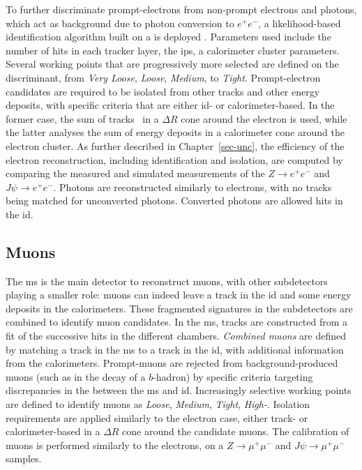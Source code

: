 To further discriminate prompt-electrons from non-prompt electrons and photons, which act as background due to photon conversion to $e^+e^-$, a likelihood-based identification algorithm built on a  is deployed \cite{Aaboud:2657964}. Parameters used include the number of hits in each tracker layer, the \glspl{ip}, a calorimeter cluster parameters. Several working points that are progressively more selected are defined on the discriminant, from \textit{Very Loose}, \textit{Loose}, \textit{Medium}, to \textit{Tight}. Prompt-electron candidates are required to be isolated from other tracks and other energy deposits, with specific criteria that are either \gls{id}- or calorimeter-based. In the former case, the sum of tracks \pt\ in a $\Delta R$ cone around the electron is used, while the latter analyses the sum of energy deposits in a calorimeter cone around the electron cluster. As further described in Chapter~\ref{sec-unc}, the efficiency of the electron reconstruction, including identification and isolation, are computed by comparing the measured and simulated measurements of the $Z\rightarrow e^+e^-$ and $J\psi\rightarrow e^+e^-$. Photons are reconstructed similarly to electrons, with no tracks being matched for unconverted photons. Converted photons are allowed hits in the \gls{id}. 

\subsection{Muons}
The \gls{ms} is the main detector to reconstruct muons, with other subdetectors playing a smaller role: muons can indeed leave a track in the \gls{id} and some energy deposits in the calorimeters. These fragmented signatures in the subdetectors are combined to identify muon candidates. In the \gls{ms}, tracks are constructed from a fit of the successive hits in the different chambers. \textit{Combined muons} are defined by matching a track in the \gls{ms} to a track in the \gls{id}, with additional information from the calorimeters. Prompt-muons are rejected from background-produced muons (such as in the decay of a $b$-hadron) by specific criteria targeting discrepancies in the \pt between the \gls{ms} and \gls{id}. Increasingly selective working points are defined to identify muons as \textit{Loose}, \textit{Medium}, \textit{Tight}, \textit{High-\pt}. Isolation requirements are applied similarly to the electron case, either track- or calorimeter-based in a $\Delta R$ cone around the candidate muons. The calibration of muons is performed similarly to the electrons, on a $Z\rightarrow \mu^+\mu^-$ and $J\psi\rightarrow \mu^+\mu^-$ samples.

